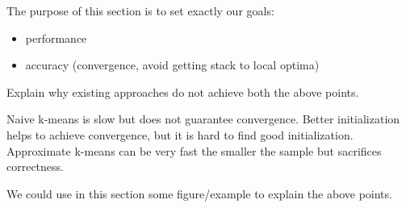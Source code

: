 The purpose of this section is to set exactly our goals:
\begin{itemize}
    \item performance
    \item accuracy (convergence, avoid getting stack to local optima)
\end{itemize}

Explain why existing approaches do not achieve both the above points.

Naive k-means is slow but does not guarantee convergence. Better initialization helps to achieve convergence, but it is hard to find good initialization. Approximate k-means can be very fast the smaller the sample but sacrifices correctness.

We could use in this section some figure/example to explain the above points.